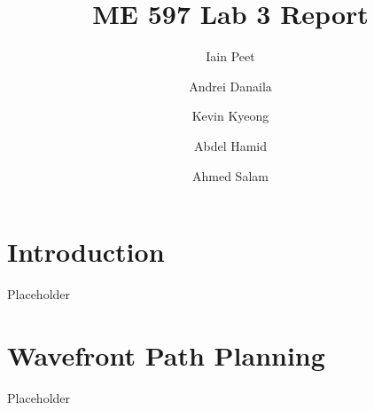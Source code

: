 \documentclass[11pt]{article} %
\title{ME 597 Lab 3 Report}
\author{Iain Peet \and Andrei Danaila \and Kevin Kyeong \and Abdel Hamid \and Ahmed Salam}
\begin{document}
\maketitle

\clearpage

\section{Introduction}
Placeholder

\section{Wavefront Path Planning}
Placeholder
\end{document}
